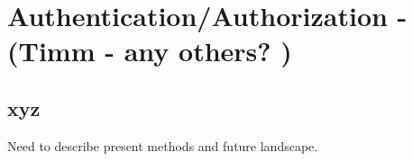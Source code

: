 \chapter{Authentication/Authorization - (Timm - any others? )}
\label{ch:auth}

\section{xyz}
\label{sec:auth:xyz}  %

Need to describe present methods and future landscape.
